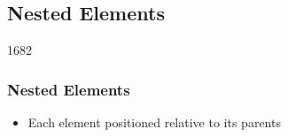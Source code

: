 %
%
%
%

\subsection{Nested Elements}


\begin{slide}{1682}\frametitle{Nested Elements}


\begin{itemize}
\item Each element positioned relative to its parents
\end{itemize}                           


\end{slide}                                                              

